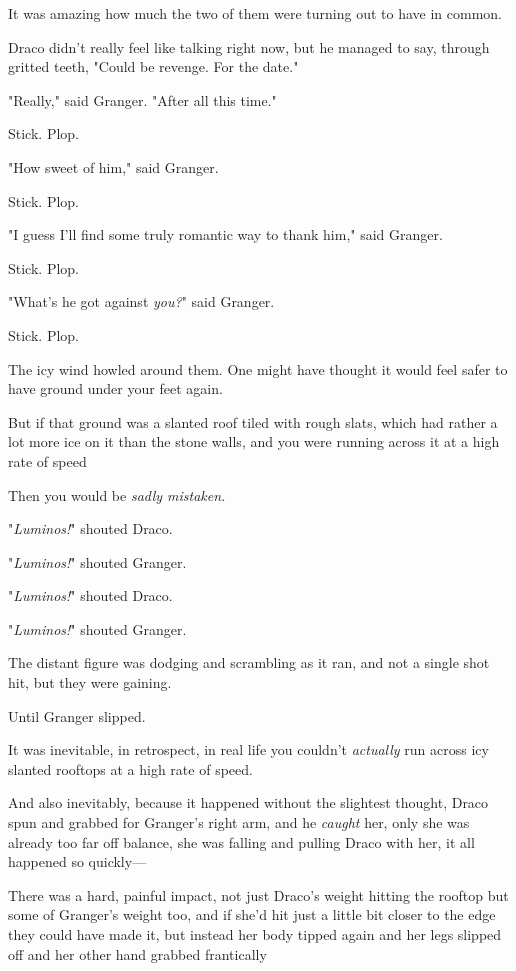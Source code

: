 It was amazing how much the two of them were turning out to have in common.

Draco didn't really feel like talking right now, but he managed to say, through
gritted teeth, "Could be revenge. For the date."

"Really," said Granger. "After all this time."

Stick. Plop.

"How sweet of him," said Granger.

Stick. Plop.

"I guess I'll find some truly romantic way to thank him," said Granger.

Stick. Plop.

"What's he got against \emph{you?}" said Granger.

Stick. Plop.

The icy wind howled around them.
\sbreak
One might have thought it would feel safer to have ground under your feet again.

But if that ground was a slanted roof tiled with rough slats, which had rather
a lot more ice on it than the stone walls, and you were running across it at a
high rate of speed{\el}

Then you would be \emph{sadly mistaken.}

"\emph{Luminos!}" shouted Draco.

"\emph{Luminos!}" shouted Granger.

"\emph{Luminos!}" shouted Draco.

"\emph{Luminos!}" shouted Granger.

The distant figure was dodging and scrambling as it ran, and not a single shot
hit, but they were gaining.

Until Granger slipped.

It was inevitable, in retrospect, in real life you couldn't \emph{actually} run
across icy slanted rooftops at a high rate of speed.

And also inevitably, because it happened without the slightest thought, Draco
spun and grabbed for Granger's right arm, and he \emph{caught} her, only she
was already too far off balance, she was falling and pulling Draco with her, it
all happened so quickly---

There was a hard, painful impact, not just Draco's weight hitting the rooftop
but some of Granger's weight too, and if she'd hit just a little bit closer to
the edge they could have made it, but instead her body tipped again and her
legs slipped off and her other hand grabbed frantically{\el}

